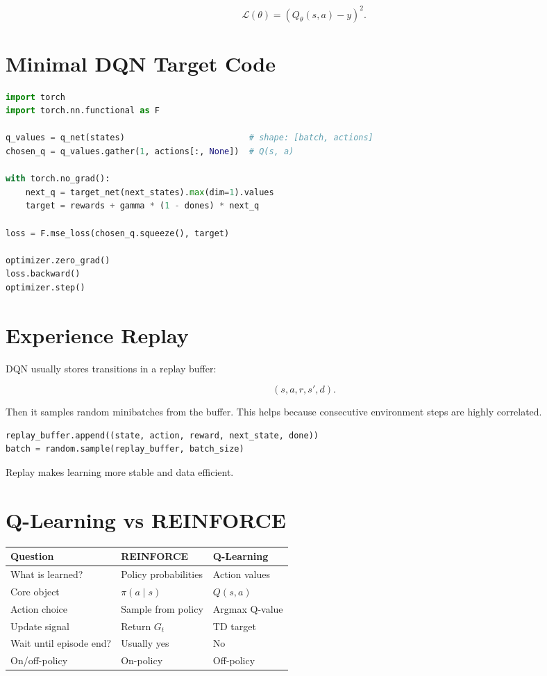 \documentclass[11pt]{article}
\begin{document}
\[
\boxed{
\mathcal{L}(\theta)
=
\left(
Q_\theta(s,a) - y
\right)^2.
}
\]

\section{Minimal DQN Target Code}

\begin{lstlisting}[language=Python]
import torch
import torch.nn.functional as F

q_values = q_net(states)                         # shape: [batch, actions]
chosen_q = q_values.gather(1, actions[:, None])  # Q(s, a)

with torch.no_grad():
    next_q = target_net(next_states).max(dim=1).values
    target = rewards + gamma * (1 - dones) * next_q

loss = F.mse_loss(chosen_q.squeeze(), target)

optimizer.zero_grad()
loss.backward()
optimizer.step()
\end{lstlisting}

\section{Experience Replay}

DQN usually stores transitions in a replay buffer:

\[
(s,a,r,s',d).
\]

Then it samples random minibatches from the buffer.
This helps because consecutive environment steps are highly correlated.

\begin{lstlisting}[language=Python]
replay_buffer.append((state, action, reward, next_state, done))
batch = random.sample(replay_buffer, batch_size)
\end{lstlisting}

Replay makes learning more stable and data efficient.

\section{Q-Learning vs REINFORCE}

\begin{center}
\begin{tabular}{lll}
\toprule
Question & REINFORCE & Q-Learning \\
\midrule
What is learned? & Policy probabilities & Action values \\
Core object & $\pi(a \mid s)$ & $Q(s,a)$ \\
Action choice & Sample from policy & Argmax Q-value \\
Update signal & Return $G_t$ & TD target \\
Wait until episode end? & Usually yes & No \\
On/off-policy & On-policy & Off-policy \\
\bottomrule
\end{tabular}
\end{center}
\end{document}
